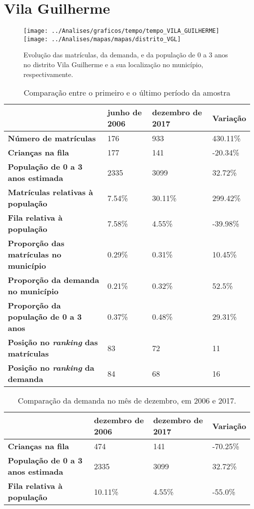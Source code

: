 \section{Vila Guilherme}
\begin{figure}[H]
	\centering
	\texttt{[image: ../Analises/graficos/tempo/tempo\_VILA\_GUILHERME]}
	\texttt{[image: ../Analises/mapas/mapas/distrito\_VGL]}
	\caption{Evolução das matrículas, da demanda, e da população de 0 a 3 anos no distrito Vila Guilherme e a sua localização no município, respectivamente.}
\end{figure}
\begin{table}[H]
	\begin{tabular}{|l|l|l|l|}
		\hline
		\textbf{}                                      & \textbf{junho de 2006}       & \textbf{dezembro de 2017}    & \textbf{Variação} \\ \hline
		\textbf{Número de matrículas}                  & 176 & 933 & 430.11\% \\ \hline
		\textbf{Crianças na fila}                      & 177 & 141 & -20.34\% \\ \hline
		\textbf{População de 0 a 3 anos estimada}      & 2335 & 3099 & 32.72\% \\ \hline
		\textbf{Matrículas relativas à população}      & 7.54\% & 30.11\% & 299.42\% \\ \hline
		\textbf{Fila relativa à população}             & 7.58\% & 4.55\% & -39.98\% \\ \hline
		\textbf{Proporção das matrículas no município} & 0.29\% & 0.31\% & 10.45\% \\ \hline
		\textbf{Proporção da demanda no município}     & 0.21\% & 0.32\% & 52.5\% \\ \hline
		\textbf{Proporção da população de 0 a 3 anos}  & 0.37\% & 0.48\% & 29.31\% \\ \hline
		\textbf{Posição no \textit{ranking} das matrículas}     & 83 & 72 & 11 \\ \hline
		\textbf{Posição no \textit{ranking} da demanda}         & 84 & 68 & 16 \\ \hline
	\end{tabular}
	\caption{Comparação entre o primeiro e o último período da amostra}
\end{table}
\begin{table}[H]
	\begin{tabular}{|l|l|l|l|}
		\hline
		\textbf{}                                 & \textbf{dezembro de 2006} & \textbf{dezembro de 2017} & \textbf{Variação} \\ \hline
		\textbf{Crianças na fila}                      & 474 & 141 & -70.25\% \\ \hline
		\textbf{População de 0 a 3 anos estimada}      & 2335 & 3099 & 32.72\% \\ \hline
		\textbf{Fila relativa à população}             & 10.11\% & 4.55\% & -55.0\% \\ \hline
	\end{tabular}
	\caption{Comparação da demanda no mês de dezembro, em 2006 e 2017.}
\end{table}
